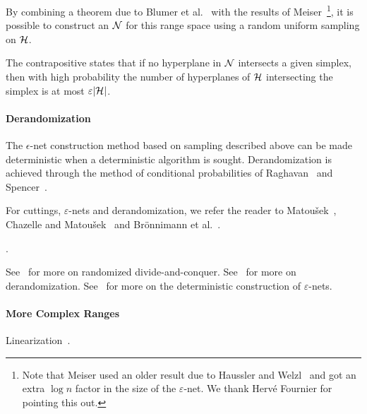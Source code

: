 By combining a theorem due to Blumer et
al.~\cite{BEHW89} with the results of Meiser~\cite{M93}\footnote{Note that
Meiser used an older result due to Haussler and Welzl~\cite{H87} and got an
extra $\log n$ factor in the size of the $\varepsilon$-net. We thank Hervé
Fournier for pointing this out.}, it is possible to
construct an \enet{} \(\mathcal{N}\) for this range space
using a random uniform sampling on \(\mathcal{H}\).
%

%
The contrapositive states that if no hyperplane in \(\mathcal{N}\) intersects
a given simplex, then with high probability the number of hyperplanes of
\(\mathcal{H}\) intersecting the simplex is at most \(\varepsilon |{\mathcal{H}}|\).

\paragraph{Derandomization}

The
\(\epsilon\)-net
construction method based on sampling
described above can be made deterministic when a deterministic algorithm is
sought.
%
Derandomization is achieved through
the method of conditional probabilities of Raghavan~\cite{Rag88}
and Spencer~\cite{Spe94}.


For cuttings, $\varepsilon$-nets and derandomization, we
refer the reader to Matou\v{s}ek~\cite{M95,M96}, Chazelle and
Matou\v{s}ek~\cite{CM96} and Brönnimann et al.~\cite{BCM99}.

.


See~\cite[Section~40.1]{CMR04} for more on randomized divide-and-conquer.
See~\cite[Section~40.6]{CMR04} for more on derandomization.
See~\cite[Section~40.7]{CMR04} for more on the deterministic construction of
\(\varepsilon\)-nets.

\paragraph{More Complex Ranges}

Linearization~\cite{YY85,AM94}.
